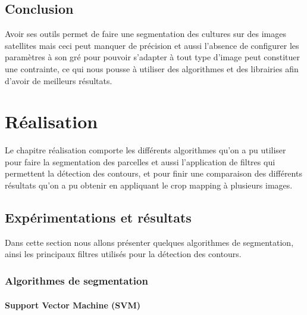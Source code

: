 \documentclass[12pt, openany]{report}
\begin{document}
\section*{Conclusion}
Avoir ses outils permet de faire une segmentation des cultures sur des images satellites mais ceci peut manquer de précision et aussi l'absence de configurer les paramètres à son gré pour pouvoir s'adapter à tout type d'image peut constituer une contrainte, ce qui nous pousse à utiliser des algorithmes et des librairies afin d'avoir de meilleurs résultats.


\chapter{Réalisation}

Le chapitre réalisation comporte les différents algorithmes qu'on a pu utiliser pour faire la segmentation des parcelles et aussi l'application de filtres qui permettent la détection des contours, et pour finir une comparaison des différents résultats qu'on a pu obtenir en appliquant le crop mapping à plusieurs images. 



\newpage

\section{Expérimentations et résultats}

Dans cette section nous allons présenter quelques algorithmes de segmentation, ainsi les principaux filtres utilisés pour la détection des contours.

\subsection{Algorithmes de segmentation}

\subsubsection{Support Vector Machine (SVM)}
\end{document}
